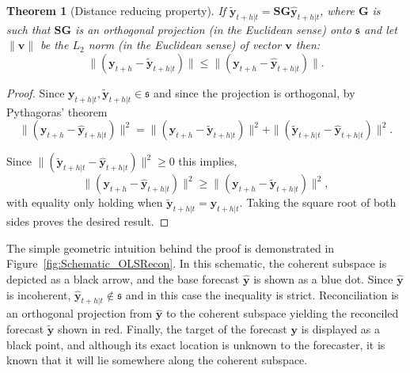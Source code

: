 \documentclass[12pt]{article}
\newtheorem{theo}{Theorem}[section]
\theoremstyle{definition}
\begin{document}
\begin{theo}[Distance reducing property]\label{th:distred}
  If $\tilde{\bm{y}}_{t+h|t}=\bm{S}\bm{G}\hat{\bm{y}}_{t+h|t}$, where $\bm{G}$ is such that $\bm{S}\bm{G}$ is an orthogonal projection (in the Euclidean sense) onto $\mathfrak{s}$ and let $\|\bm{v}\|$ be the $L_2$ norm (in the Euclidean sense) of vector $\bm{v}$ then:
  \begin{equation*}
    \|(\bm{y}_{t+h}-\tilde{\bm{y}}_{t+h|t})\|\le\|(\bm{y}_{t+h}-\hat{\bm{y}}_{t+h|t})\|.
  \end{equation*}
\end{theo}
\begin{proof}
  Since $\bm{y}_{t+h|t},\tilde{\bm{y}}_{t+h|t}\in\mathfrak{s}$ and since the projection is orthogonal, by Pythagoras' theorem
  \begin{equation*} \|(\bm{y}_{t+h}-\hat{\bm{y}}_{t+h|t})\|^2=\|(\bm{y}_{t+h}-\tilde{\bm{y}}_{t+h|t})\|^2+\|(\tilde{\bm{y}}_{t+h|t}-\hat{\bm{y}}_{t+h|t})\|^2.
  \end{equation*}

  Since $\|(\tilde{\bm{y}}_{t+h|t}-\hat{\bm{y}}_{t+h|t})\|^2\ge 0$ this implies,
  \begin{equation*} \|(\bm{y}_{t+h}-\hat{\bm{y}}_{t+h|t})\|^2\ge\|(\bm{y}_{t+h}-\tilde{\bm{y}}_{t+h|t})\|^2,
  \end{equation*}
  with equality only holding when $\tilde{\bm{y}}_{t+h|t}=\hat{\bm{y}}_{t+h|t}$. Taking the square root of both sides proves the desired result.
\end{proof}

The simple geometric intuition behind the proof is demonstrated in Figure~\ref{fig:Schematic_OLSRecon}. In this schematic, the coherent subspace is depicted as a black arrow, and the base forecast $\hat{\bm{y}}$ is shown as a blue dot. Since $\hat{\bm{y}}$ is incoherent, $\hat{\bm{y}}_{t+h|t}\notin\mathfrak{s}$ and in this case the inequality is strict. Reconciliation is an orthogonal projection from $\hat{\bm{y}}$ to the coherent subspace yielding the reconciled forecast $\tilde{\bm{y}}$ shown in red. Finally, the target of the forecast $\bm{y}$ is displayed as a black point, and although its exact location is unknown to the forecaster, it is known that it will lie somewhere along the coherent subspace.
\end{document}
